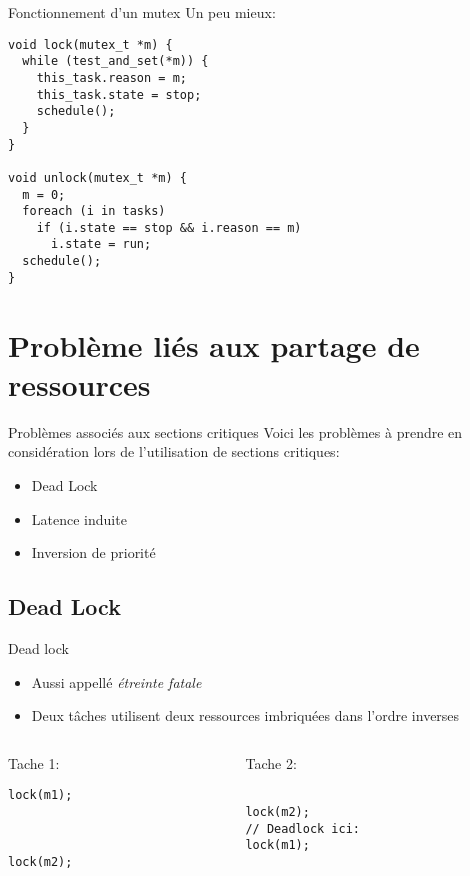 \begin{frame}[fragile]{Fonctionnement d'un mutex}
  Un peu mieux:
  \begin{lstlisting}
void lock(mutex_t *m) {
  while (test_and_set(*m)) {
    this_task.reason = m;
    this_task.state = stop;
    schedule();
  }
}

void unlock(mutex_t *m) {
  m = 0;
  foreach (i in tasks)
    if (i.state == stop && i.reason == m)
      i.state = run;
  schedule();
}
  \end{lstlisting}
\end{frame}

\section{Problème liés aux partage de ressources}

\begin{frame}{Problèmes associés aux sections critiques}
  Voici les problèmes à prendre en considération lors de l'utilisation
  de sections critiques:
  \begin{itemize}
  \item Dead Lock
  \item Latence induite
  \item Inversion de priorité
  \end{itemize}
\end{frame}

\subsection{Dead Lock}

\begin{frame}[fragile]{Dead lock}
  \begin{itemize}
  \item Aussi appellé \emph{étreinte fatale}
  \item Deux tâches utilisent  deux ressources imbriquées dans l'ordre
    inverses
  \end{itemize}
  \begin{columns}
    \begin{column}{5cm}
      Tache 1:
      \begin{lstlisting}[showlines=true,emptylines=10]
lock(m1);



lock(m2);
      \end{lstlisting}
    \end{column}
    \begin{column}{5cm}
      Tache 2:
      \begin{lstlisting}[showlines=true,emptylines=10]

lock(m2);
// Deadlock ici:
lock(m1);

      \end{lstlisting}
    \end{column}
  \end{columns}
  \begin{center}
    
  \end{center}
\end{frame}

